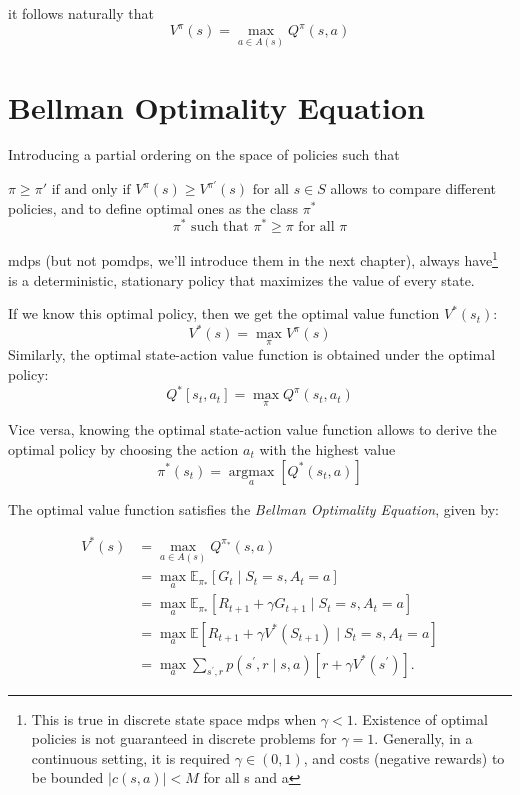 it follows naturally that 
\[
    V^{\pi}(s)= \max _{a \in A(s)} Q^{\pi}(s, a)
\]

\section{Bellman Optimality Equation}

Introducing a partial ordering on the space of policies such that 

$\pi \geq \pi' \text{ if and only if } V^{\pi}(s) \geq V^{\pi'}(s) \text{ for all } s \in S$
allows to compare different policies, and to define optimal ones as the class $\pi^*$ 
$$\pi^* \text{ such that } \pi^* \geq \pi \text{ for all } \pi$$


\glspl{mdp} (but not \glspl{pomdp}, we'll introduce them in the next chapter), always have\footnote{This 
is true in discrete state space \gls{mdp}s when $\gamma < 1$. 
Existence of optimal policies is not guaranteed in discrete problems for $\gamma = 1$. Generally, in a continuous setting, 
it is required $\gamma \in (0,1)$, and costs (negative rewards) to be bounded $|c(s,a)|<M$ for all s and a}
 is a 
deterministic, stationary policy that maximizes the value of every state. \cite{96ef8573-56cc-3a43-a4c7-3c6543c30f4e}
    
If we know this optimal policy, then we get the optimal value function $V^{*}(s_{t})$:
\[
V^{*}(s)=\max _{\pi}V^{\pi}(s)
\]
 Similarly, the optimal state-action value function is obtained under the optimal policy:
$$
Q^{*}\left[s_{t}, a_{t}\right]=\max _{\pi} Q^{\pi}\left(s_{t}, a_{t}\right)
$$

Vice versa, knowing the optimal state-action value function allows to derive the optimal policy by 
choosing the action \(a_{t}\) with the highest value
\[
\pi^*\left(s_{t}\right) = \underset{a}{\operatorname{argmax}}\left[Q^{*}\left(s_{t}, a\right)\right]
\]

The optimal value function satisfies the \textit{Bellman Optimality Equation}, given by:

\begin{align}
    V^{\ast }(s)&=\max\limits_{a\in A(s)}Q^{\pi _{\ast }}(s,a) \nonumber \\ 
    & =\max\limits_{a}\mathbb{E}_{\pi _{\ast }}[G_{t}\mid S_{t}=s,A_{t}=a] \nonumber \\ 
    & =\max\limits_{a}\mathbb{E}_{\pi _{\ast }}[R_{t+1}+\gamma G_{t+1}\mid
    S_{t}=s,A_{t}=a] \nonumber \\ 
    & =\max\limits_{a}\mathbb{E}[R_{t+1}+\gamma V^{\ast }(S_{t+1})\mid
    S_{t}=s,A_{t}=a] \nonumber \\ 
    & =\max\limits_{a}\sum\limits_{s^{\prime },r}p(s^{\prime
    },r\mid s,a)\left[ r+\gamma V^{\ast }(s^{\prime })\right].%
    \label{Bellman-optimality-eq}
\end{align}

